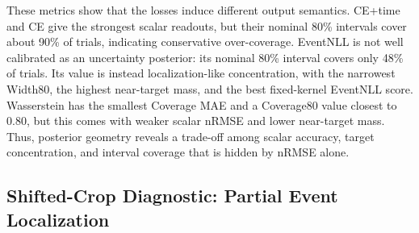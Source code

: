 \documentclass[12pt]{article}
\begin{document}
\begin{table}[!t]
\centering
\caption{Quantitative posterior geometry on R11 for matched event-time segmentation losses. Metrics are defined in the text. CRPS is reported in milliseconds. Fixed-kernel EventNLL uses a common Gaussian observation kernel for all models ($\sigma=0.15$~s). For Coverage80, values closer to 0.80 indicate better nominal 80\% interval coverage; for Coverage MAE, lower is better.}
\label{tab:posterior_geometry_metrics}
\scriptsize
\setlength{\tabcolsep}{3pt}
\renewcommand{\arraystretch}{1.12}
\end{table}

These metrics show that the losses induce different output semantics. CE+time and CE give the strongest scalar readouts, but their nominal 80\% intervals cover about 90\% of trials, indicating conservative over-coverage. EventNLL is not well calibrated as an uncertainty posterior: its nominal 80\% interval covers only 48\% of trials. Its value is instead localization-like concentration, with the narrowest Width80, the highest near-target mass, and the best fixed-kernel EventNLL score. Wasserstein has the smallest Coverage MAE and a Coverage80 value closest to 0.80, but this comes with weaker scalar nRMSE and lower near-target mass. Thus, posterior geometry reveals a trade-off among scalar accuracy, target concentration, and interval coverage that is hidden by nRMSE alone.

\subsection{Shifted-Crop Diagnostic: Partial Event Localization}
\end{document}
